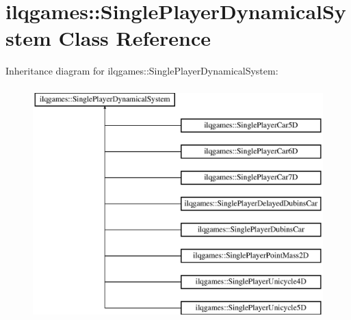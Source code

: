 \hypertarget{classilqgames_1_1_single_player_dynamical_system}{}\section{ilqgames\+:\+:Single\+Player\+Dynamical\+System Class Reference}
\label{classilqgames_1_1_single_player_dynamical_system}
Inheritance diagram for ilqgames\+:\+:Single\+Player\+Dynamical\+System\+:\begin{figure}[H]
\begin{center}
\leavevmode
\includegraphics[height=9.000000cm]{classilqgames_1_1_single_player_dynamical_system}
\end{center}
\end{figure}
